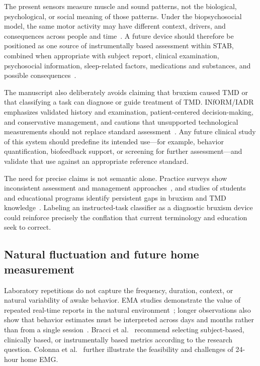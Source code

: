 \documentclass[pdflatex,sn-nature,iicol]{sn-jnl}
\begin{document}
The present sensors measure muscle and sound patterns, not the biological, psychological, or social meaning of those patterns. Under the biopsychosocial model, the same motor activity may have different context, drivers, and consequences across people and time~\cite{manfredini2026biopsychosocial}. A future device should therefore be positioned as one source of instrumentally based assessment within STAB, combined when appropriate with subject report, clinical examination, psychosocial information, sleep-related factors, medications and substances, and possible consequences~\cite{manfredini2024standardised}.

The manuscript also deliberately avoids claiming that bruxism caused TMD or that classifying a task can diagnose or guide treatment of TMD. INfORM/IADR emphasizes validated history and examination, patient-centered decision-making, and conservative management, and cautions that unsupported technological measurements should not replace standard assessment~\cite{inform2025tmd}. Any future clinical study of this system should predefine its intended use---for example, behavior quantification, biofeedback support, or screening for further assessment---and validate that use against an appropriate reference standard.

The need for precise claims is not semantic alone. Practice surveys show inconsistent assessment and management approaches~\cite{mungia2025approaches}, and studies of students and educational programs identify persistent gaps in bruxism and TMD knowledge~\cite{nasanen2026competence,sangalli2026education}. Labeling an instructed-task classifier as a diagnostic bruxism device could reinforce precisely the conflation that current terminology and education seek to correct.

\subsection{Natural fluctuation and future home measurement}

Laboratory repetitions do not capture the frequency, duration, context, or natural variability of awake behavior. EMA studies demonstrate the value of repeated real-time reports in the natural environment~\cite{bracci2018frequency}; longer observations also show that behavior estimates must be interpreted across days and months rather than from a single session~\cite{colonna2025fluctuation}. Bracci et al.~\cite{bracci2024metrics} recommend selecting subject-based, clinically based, or instrumentally based metrics according to the research question. Colonna et al.~\cite{colonna2023electromyographic} further illustrate the feasibility and challenges of 24-hour home EMG.
\end{document}
